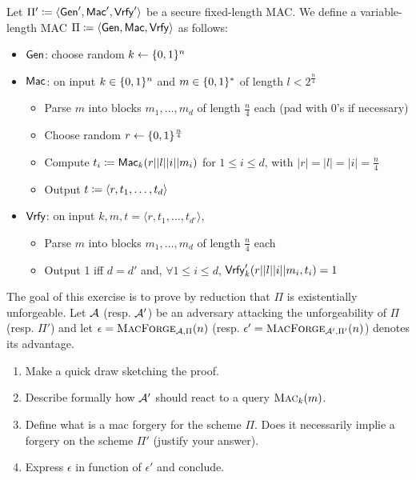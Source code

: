 Let $\Pi' \coloneqq \langle\operatorname{\mathsf{Gen}}',\operatorname{\mathsf{Mac}}',\operatorname{\mathsf{Vrfy}}'\rangle$ be a secure fixed-length MAC. We define a variable-length MAC $\Pi \coloneqq \langle\operatorname{\mathsf{Gen}},\operatorname{\mathsf{Mac}},\operatorname{\mathsf{Vrfy}}\rangle$ as follows:

\begin{itemize}
	\item $\operatorname{\mathsf{Gen}}$: choose random $k \leftarrow \{0, 1\}^n$
	\item $\operatorname{\mathsf{Mac}}$: on input $k \in\{0, 1\}^n$ and $m \in \{0, 1\}^*$ of length $l<2^\frac n4$
	\begin{itemize}
		\item Parse $m$ into blocks $m_1,\dots,m_d$ of length $\frac n4$ each (pad with 0's if necessary)
		\item Choose random $r \leftarrow \{0, 1\}^\frac n4$
		\item Compute $t_i \coloneqq \operatorname{\mathsf{Mac}}_k(r||l||i||m_i)$ for $1\leq i\leq d$, with $|r|=|l|=|i|=\frac n4$
		\item Output $t \coloneqq \langle r,t_1,\dots,t_d\rangle$
	\end{itemize}
	\item $\operatorname{\mathsf{Vrfy}}$: on input $k, m, t=\langle r,t_1,\ldots,t_{d'}\rangle$,
	\begin{itemize}
		\item Parse $m$ into blocks $m_1,\ldots,m_d$ of length $\frac n4$ each
		\item Output 1 iff $d=d'$ and, $\forall 1\leq i\leq d$, $\operatorname{\mathsf{Vrfy}}'_k(r||l||i||m_i,t_i)=1$
	\end{itemize}
\end{itemize}

The goal of this exercise is to prove by reduction that $\Pi$ is existentially unforgeable. Let $\mathcal{A}$ (resp. $\mathcal{A}'$) be an adversary attacking the unforgeability of $\Pi$ (resp. $\Pi'$) and let $\epsilon = \textsc{MacForge}_{\mathcal{A},\Pi}(n)$ (resp. $\epsilon' = \textsc{MacForge}_{\mathcal{A}',\Pi'}(n)$) denotes its advantage.

\begin{enumerate}
	\item Make a quick draw sketching the proof.
	\item Describe formally how $\mathcal{A}'$ should react to a query $\textsc{Mac}_k(m)$.
	\item Define what is a mac forgery for the scheme $\Pi$. Does it necessarily implie a forgery on the scheme $\Pi'$ (justify your answer).
	\item Express $\epsilon$ in function of $\epsilon'$ and conclude.
\end{enumerate}


